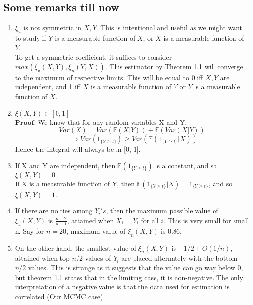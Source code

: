 \subsection{Some remarks till now}
\begin{enumerate}
    \item $\xi_n$ is not symmetric in $X, Y$. This is intentional and useful as we might want to study if $Y$ is a measurable function of $X$, or $X$ is a measurable function of $Y$. \\ To get a symmetric coefficient, it suffices to consider $max(\xi_n(X, Y), \xi_n(Y, X))$. This estimator by Theorem 1.1 will converge to the maximum of respective limits. This will be equal to 0 iff $X, Y$ are independent, and 1 iff $X$ is a measurable function of $Y$ or $Y$ is a measurable function of $X$.

    \item $\xi(X, Y) \in [0, 1]$ \\
    $\textbf{Proof:}$ We know that for any random variables X and Y,
    $$Var(X) = Var(\mathbb{E}(X|Y)) + \mathbb{E}(Var(X|Y))$$
    $$\implies Var(1_{\{Y \geq t\}}) \geq Var(\mathbb{E}(1_{\{Y \geq t\}}|X))$$
    Hence the integral will always be in [0, 1].

    \item If X and Y are independent, then $\mathbb{E}(1_{\{Y \geq t\}})$ is a constant, and so $\xi(X, Y) = 0$ \\ If X is a measurable function of Y, then $\mathbb{E}(1_{\{Y \geq t\}}|X) = 1_{\{Y \geq t\}}$, and so $\xi(X, Y) = 1$.

    \item If there are no ties among $Y_i's$, then the maximum possible value of $\xi_n(X, Y)$ is $\frac{n-2}{n+1}$, attained when $X_i = Y_i$ for all $i$. This is very small for small n. Say for $n=20$, maximum value of $\xi_n(X,Y)$ is 0.86.

    \item On the other hand, the smallest value of $\xi_n(X, Y)$ is $-1/2 + O(1/n)$, attained when top $n/2$ values of $Y_i$ are placed alternately with the bottom $n/2$ values. This is strange as it suggests that the value can go way below 0, but theorem 1.1 states that in the limiting case, it is non-negative. The only interpretation of a negative value is that the data used for estimation is correlated (Our MCMC case).

\end{enumerate}
